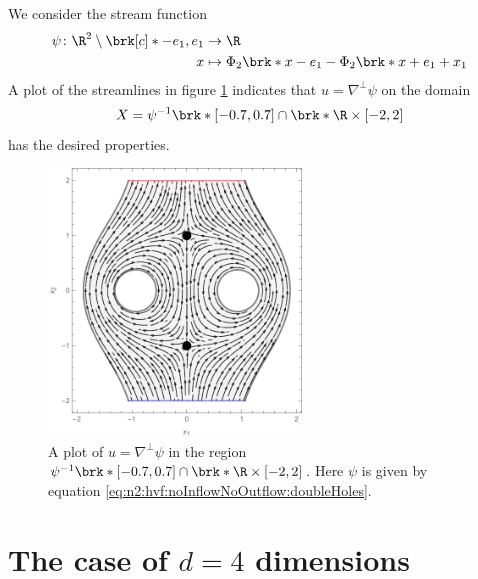 \begin{example}
  We consider the stream function
  \begin{equation}
    \begin{aligned}
    \psi\colon\R^2\setminus\brk[c]*{-e_1,e_1}&\to\R \\
    x&\mapsto\Phi_2\brk*{x-e_1}-\Phi_2\brk*{x+e_1}+x_1
    \end{aligned}\label{eq:n2:hvf:noInflowNoOutflow:doubleHoles}
  \end{equation}
  A plot of the streamlines in figure \ref{pl:n2_hvf_InflowOutflow_symmetric_region} indicates that $u=\nabla^\perp\psi$ 
  on the domain
  $$X=\psi^{-1}\brk*{[-0.7,0.7]}\cap \brk*{\R\times[-2,2]}$$
  has the desired properties.
  \begin{figure}
    \centering
    \includegraphics[width=0.6\textwidth]{../Plots/n2_hvf_InflowOutflow_symmetric_gray_2.pdf}
    \caption{A plot of $u=\nabla^\perp\psi$ in the region $\psi^{-1}\brk*{[-0.7,0.7]}\cap \brk*{\R\times[-2,2]}$.
    Here $\psi$ is given by equation \eqref{eq:n2:hvf:noInflowNoOutflow:doubleHoles}.}
    \label{pl:n2_hvf_InflowOutflow_symmetric_region}
  \end{figure}
\end{example}

\section{The case of $d=4$ dimensions}

